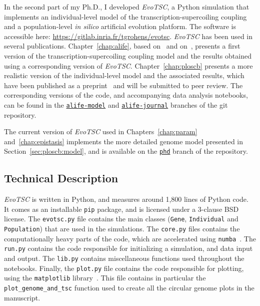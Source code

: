 In the second part of my Ph.D., I developed \emph{EvoTSC}, a Python simulation that implements an individual-level model of the transcription-supercoiling coupling and a population-level \emph{in silico} artificial evolution platform.
The software is accessible here: \url{https://gitlab.inria.fr/tgrohens/evotsc}.
\emph{EvoTSC} has been used in several publications.
Chapter~\ref{chap:alife}, based on~\cite{grohens2021} and on~\cite{grohens2022a}, presents a first version of the transcription-supercoiling coupling model and the results obtained using a corresponding version of \emph{EvoTSC}.
Chapter~\ref{chap:ploscb} presents a more realistic version of the individual-level model and the associated results, which have been published as a preprint~\citep{grohens2022b} and will be submitted to peer review.
The corresponding versions of the code, and accompanying data analysis notebooks, can be found in the \href{https://gitlab.inria.fr/tgrohens/evotsc/-/tree/alife-model}{\texttt{alife-model}} \citep{grohens2021} and \href{https://gitlab.inria.fr/tgrohens/evotsc/-/tree/alife-journal}{\texttt{alife-journal}} \citep{grohens2022a} branches of the git repository.

The current version of \emph{EvoTSC} used in Chapters~\ref{chap:param} and~\ref{chap:epistasis} implements the more detailed genome model presented in Section~\ref{sec:ploscb:model}, and is available on the \href{https://gitlab.inria.fr/tgrohens/evotsc/-/tree/phd}{\texttt{phd}} branch of the repository.

\subsection{Technical Description}

\emph{EvoTSC} is written in Python, and measures around 1,800 lines of Python code.
It comes as an installable \texttt{pip} package, and is licensed under a 3-clause BSD license.
The \texttt{evotsc.py} file contains the main classes (\texttt{Gene}, \texttt{Individual} and \texttt{Population}) that are used in the simulations.
The \texttt{core.py} files contains the computationally heavy parts of the code, which are accelerated using \texttt{numba}~\citep{lam2015}.
The \texttt{run.py} contains the code responsible for initializing a simulation, and data input and output.
The \texttt{lib.py} contains miscellaneous functions used throughout the notebooks.
Finally, the \texttt{plot.py} file contains the code responsible for plotting, using the \texttt{matplotlib} library~\citep{hunter2007}.
This file contains in particular the \texttt{plot\_genome\_and\_tsc} function used to create all the circular genome plots in the manuscript.

